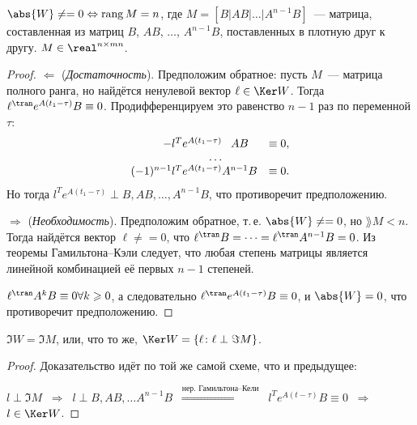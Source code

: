 {%
\begin{stm}
  $\abs{W} \neq = 0 \Leftrightarrow \rang M = n$,
  где $M = [B | AB | \ldots | A^{n - 1} B]$~--- матрица,
  составленная из матриц $B$, $AB$, $\ldots$, $A^{n - 1} B$,
  поставленных в плотную друг к другу.
  $M \in \real^{n \times m n}$.
\end{stm}

\begin{proof}
  $\Longleftarrow$ (\emph{Достаточность}). Предположим обратное:
  пусть $M$~--- матрица полного ранга, но найдётся ненулевой вектор $\ell \in \Ker W$.
  Тогда $\ell^\tran e^{A(t_1 - \tau)} B \equiv 0$.
  Продифференцируем это равенство $n - 1$ раз по переменной $\tau$: 
  \begin{equation}
	  \begin{array}{r@{}cl}
		  -l^T e^{A(t_1-\tau)} &AB &\equiv 0,\\
		  \dots\\
		  (-1)^{n-1} l^T e^{A(t_1-\tau)} &A^{n-1}B &\equiv 0.
	  \end{array}
  \end{equation}
  Но тогда $l^Te^{A(t_1-\tau)} \perp B, AB, \ldots, A^{n-1}B$, что противоречит предположению.
  
  $\Longrightarrow$ (\emph{Необходимость}).
  Предположим обратное, т.\,е. $\abs{W} \neq = 0$, но $\rang M < n$.
  Тогда найдётся вектор $\ell \neq = 0$,
  что $\ell^\tran B = \dots = \ell^\tran A^{n - 1} B = 0$.
  Из теоремы Гамильтона--Кэли следует, что любая степень матрицы является
  линейной комбинацией её первых $n-1$ степеней.

  $\ell^\tran A^k B \equiv 0 \forall k \geqslant 0$,
  а следовательно $\ell^\tran e^{A(t_1 - \tau)} B \equiv 0$,
  и $\abs{W} = 0$, что противоречит предположению.
\end{proof}
	
\begin{stm}
  $\Im W = \Im M$, или, что то же, $\Ker W = \left\lbrace \ell \colon \ell \perp \Im M\right\rbrace$.
\end{stm}
\begin{proof}
	Доказательство идёт по той же самой схеме, что и предыдущее: %
	
	$l\perp \Im M$ $\ \Rightarrow\ $ $l \perp B,AB,\dots A^{n-1}B$ $\ \stackrel{\text{нер. Гамильтона--Кели}}{\Rightarrow}\ $  $l^T e^{A(t-\tau)}B\equiv0$ $\ \Rightarrow\ $ $l \in \Ker W$.
	

\end{proof}}
